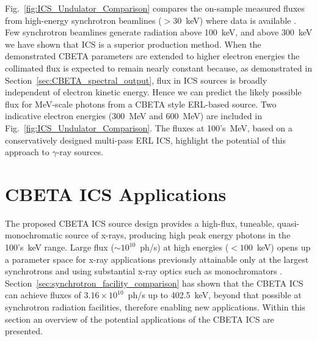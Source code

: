 \documentclass[../main.tex]{subfiles}
\begin{document}
Fig.~\ref{fig:ICS_Undulator_Comparison} compares the on-sample measured fluxes from high-energy synchrotron beamlines ($>$30~\si{\kilo\electronvolt}) where data is available \cite{apsbeamlines,esrfbeamlines,petraiiibeamlines,spring8beamlines}. Few synchrotron beamlines generate radiation above 100~\si{\kilo\electronvolt}, and above 300~\si{\kilo\electronvolt} we have shown that ICS is a superior production method. When the demonstrated CBETA parameters are extended to higher electron energies the collimated flux is expected to remain nearly constant because, as demonstrated in Section~\ref{sec:CBETA_spectral_output}, flux in ICS sources is broadly independent of electron kinetic energy. Hence we can predict the likely possible flux for \si{\mega\electronvolt}-scale photons from a CBETA style ERL-based source. Two indicative electron energies (300~\si{\mega\electronvolt} and 600~\si{\mega\electronvolt}) are included in Fig.~\ref{fig:ICS_Undulator_Comparison}. The fluxes at 100's~\si{\mega\electronvolt}, based on a conservatively designed multi-pass ERL ICS, highlight the potential of this approach to $\gamma$-ray sources. 

\section{CBETA ICS Applications}
\label{sec:CBETA_ICS_applications}

The proposed CBETA ICS source design provides a high-flux, tuneable, quasi-monochromatic source of x-rays, producing high peak energy photons in the 100's~\si{\kilo\electronvolt} range. Large flux ($\sim 10^{10}$~ph/\si{\second}) at high energies ($< 100$~\si{\kilo\electronvolt}) opens up a parameter space for x-ray applications previously attainable only at the largest synchrotrons and using substantial x-ray optics such as monochromators \cite{caciuffo1987monochromators}. Section~\ref{sec:synchrotron_facility_comparison} has shown that the CBETA ICS can achieve fluxes of $3.16\times 10^{10}$~ph/\si{\second} up to 402.5~\si{\kilo\electronvolt}, beyond that possible at synchrotron radiation facilities, therefore enabling new applications. Within this section an overview of the potential applications of the CBETA ICS are presented.   
\end{document}
